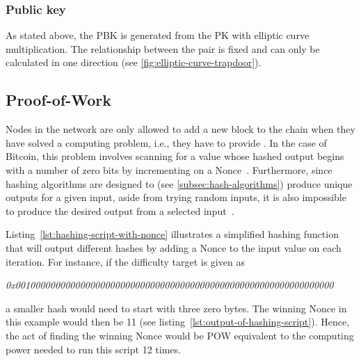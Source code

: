 \subsubsection{Public key}\label{subsubsec:public-key}

As stated above, the \gls{PBK} is generated from the \gls{PK} with elliptic curve multiplication.
The relationship between the pair is fixed and can only be calculated in one direction (see \cref{fig:elliptic-curve-trapdoor}).

\subsection{Proof-of-Work}\label{subsec:pow}

Nodes in the network are only allowed to add a new block to the chain when they have solved a computing problem, i.e., they have to provide .
In the case of Bitcoin, this problem involves scanning for a value whose hashed output begins with a number of zero bits by incrementing on a \gls{Nonce}~\autocite[3]{nakamoto_bitcoin_2008}.
Furthermore, since hashing algorithms are designed to (see \cref{subsec:hash-algorithms}) produce unique outputs for a given input, aside from trying random inputs, it is also impossible to produce the desired output from a selected input~\autocite[189]{antonopoulos_mastering_2017}.


Listing~\ref{lst:hashing-script-with-nonce} illustrates a simplified hashing function that will output different hashes by adding a \gls{Nonce} to the input value on each iteration.
For instance, if the difficulty target is given as

\smallskip
\begingroup\small\emph{0x0010000000000000000000000000000000000000000000000000000000000000}\endgroup
\smallskip

a smaller hash would need to start with three zero bytes.
The winning \gls{Nonce} in this example would then be 11 (see listing~\ref{lst:output-of-hashing-script}).
Hence, the act of finding the winning \gls{Nonce} would be \gls{POW} equivalent to the computing power needed to run this script 12 times.


